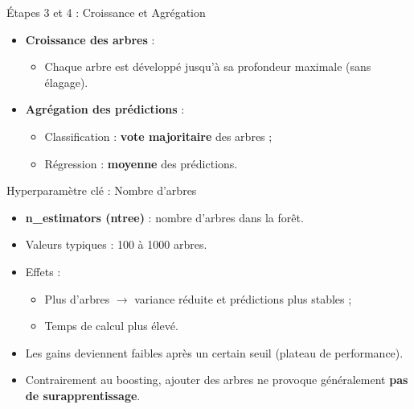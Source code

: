 \documentclass[11pt]{beamer}
\begin{document}
\begin{frame}{Étapes 3 et 4 : Croissance et Agrégation}
\begin{itemize}
    \item \textbf{Croissance des arbres} :
    \begin{itemize}
        \item Chaque arbre est développé jusqu'à sa profondeur maximale (sans élagage).
    \end{itemize}
    
    \medskip
    \item \textbf{Agrégation des prédictions} :
    \begin{itemize}
        \item Classification : \textbf{vote majoritaire} des arbres ;
        \item Régression : \textbf{moyenne} des prédictions.
    \end{itemize}
\end{itemize}
\end{frame}

\begin{frame}{Hyperparamètre clé : Nombre d'arbres}
\begin{itemize}
    \item \textbf{n\_estimators (ntree)} : nombre d'arbres dans la forêt.
    \item Valeurs typiques : 100 à 1000 arbres.
    \item Effets :
    \begin{itemize}
        \item Plus d'arbres $\rightarrow$ variance réduite et prédictions plus stables ;
        \item Temps de calcul plus élevé.
    \end{itemize}
    \item Les gains deviennent faibles après un certain seuil (plateau de performance).
    \item Contrairement au boosting, ajouter des arbres ne provoque généralement \textbf{pas de surapprentissage}.
\end{itemize}
\end{frame}
\end{document}
